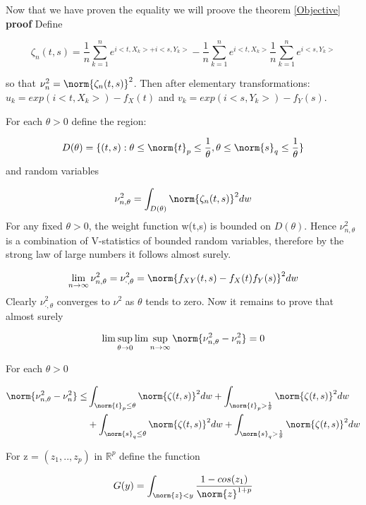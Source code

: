 Now that we have proven the equality we will proove the theorem \ref{Objective}
\textbf{proof}
Define 

$$
\zeta_{n}(t,s) = \frac{1}{n}\sum_{k=1}^{n}e^{i<t,X_{k}>+i<s,Y_{k}>}- \frac{1}{n}\sum_{k=1}^{n}e^{i<t,X_{k}>}\frac{1}{n}\sum_{k=1}^{n}e^{i<s,Y_{k}>}
$$

so that $\nu^{2}_{n} = \norm{\zeta_{n}(t,s)}^{2}$. Then after elementary transformations: $u_{k} = exp(i<t,X_{k}>)-f_{X}(t)$ and $v_{k} = exp(i<s,Y_{k}>)-f_{Y}(s)$.

For each $\theta>0$ define the region:

$$
D(\theta) = \{(t,s):\theta\leq\norm{t}_{p}\leq\frac{1}{\theta}, \theta\leq\norm{s}_{q}\leq\frac{1}{\theta}\}
$$ 
and random variables 

$$
\nu^{2}_{n,\theta} = \int_{D(\theta)}\norm{\zeta_{n}(t,s)}^{2}dw
$$
For any fixed $\theta>0$, the weight function w(t,s) is bounded on $D(\theta)$. Hence $\nu^{2}_{n,\theta}$ is a combination of V-statistics of bounded random variables, therefore by the strong law of large numbers
it follows almost surely.

$$
\lim_{n\to\infty}\nu^{2}_{n,\theta} = \nu^{2}_{\cdot,\theta} = \norm{f_{XY}(t,s) - f_{X}(t)f_{Y}(s)}^{2}dw
$$
Clearly $\nu^{2}_{\cdot,\theta}$ converges to $\nu^{2}$ as $\theta$ tends to zero. Now it remains to prove that almost surely

$$
\lim\sup_{\theta \to 0} \lim\sup_{n \to \infty} \norm{\nu^{2}_{n,\theta}-\nu^{2}_{n}} = 0
$$

For each $\theta>0$

\begin{equation}{}
\begin{split}
\norm{\nu^{2}_{n,\theta} - \nu^{2}_{n}} \leq &
\int_{\norm{t}_{p}\leq\theta}\norm{\zeta(t,s)}^{2}dw + \int_{\norm{t}_{p}>\frac{1}{\theta}}\norm{\zeta(t,s)}^{2}dw \\
& + \int_{\norm{s}_{q}\leq\theta}\norm{\zeta(t,s)}^{2}dw + \int_{\norm{s}_{q}>\frac{1}{\theta}}\norm{\zeta(t,s)}^{2}dw
\end{split}
\end{equation}\label{asymptotic_inequality}

For z = $(z_{1},..,z_{p})$ in $\mathbb{R}^{p}$ define the function

$$
G(y) = \int_{\norm{z}<y} \frac{1-cos(z_{1})}{\norm{z}^{1+p}}
$$

